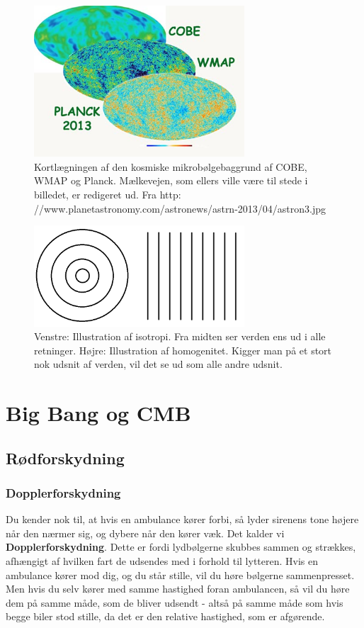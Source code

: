 \begin{figure}[H]
	\centering
	\includegraphics[width=0.7\textwidth]{Astrofysik/Astrofig/CMB.jpg}
	\caption{Kortlægningen af den kosmiske mikrobølgebaggrund af COBE, WMAP og
		Planck. Mælkevejen, som ellers ville være til stede i billedet, er redigeret ud. Fra http:
		//www.planetastronomy.com/astronews/astrn-2013/04/astron3.jpg}
	\label{isohomo}
\end{figure}

\begin{figure}[H]
	\centering
	\includegraphics[width=0.7\textwidth]{Astrofysik/Astrofig/isohomo.png}
	\caption{Venstre: Illustration af isotropi. Fra midten ser verden ens ud i alle retninger. Højre: Illustration af homogenitet. Kigger man på et stort nok udsnit af verden, vil det se ud som alle andre udsnit.}
	\label{isohomo}
\end{figure}

\section{Big Bang og CMB}

\subsection{Rødforskydning}
\subsubsection{Dopplerforskydning}
Du kender nok til, at hvis en ambulance kører forbi, så lyder sirenens tone højere når den nærmer sig, og dybere når den kører væk. Det kalder vi \textbf{Dopplerforskydning}. %
Dette er fordi lydbølgerne skubbes sammen og strækkes, afhængigt af hvilken fart de udsendes med i forhold til lytteren. Hvis en ambulance kører mod dig, og du står stille, vil du høre bølgerne sammenpresset. Men hvis du selv kører med samme hastighed foran ambulancen, så vil du høre dem på samme måde, som de bliver udsendt - altså på samme måde som hvis begge biler stod stille, da det er den relative hastighed, som er afgørende.

